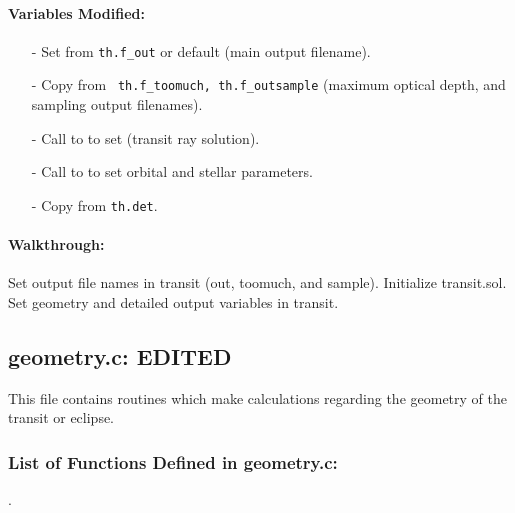 \documentclass[letterpaper,12pt]{article}
\begin{document}
\paragraph{Variables Modified:}
\begin{enumerate}[leftmargin=10pt, noitemsep, parsep=0pt, topsep=0ex]
\item[-] Set  from {\tt th.f\_out} or default (main
  output filename).
\item[-] Copy  from {\tt
    th.f\_toomuch, th.f\_outsample} (maximum optical depth, and
  sampling output filenames).
\item[-] Call to  to set 
  (transit ray solution).
\item[-] Call to  to set orbital and stellar parameters.
\item[-] Copy  from {\tt th.det}.
\end{enumerate}

\paragraph{Walkthrough:}
Set output file names in transit (out, toomuch, and
sample). Initialize transit.sol. Set geometry and detailed output
variables in transit.

\newpage
\subsection{geometry.c: EDITED}
This file contains routines which make calculations regarding the geometry of the transit or eclipse.
\subsubsection{List of Functions Defined in geometry.c:}
 \newline

. \newline
\end{document}
